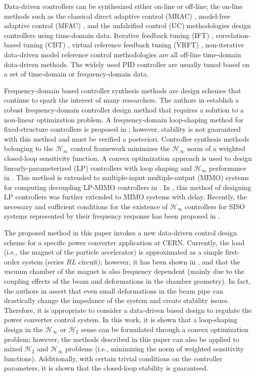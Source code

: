 \documentclass[a4paper, 10pt, conference]{ieeeconf}
\begin{document}
Data-driven controllers can be synthesized either on-line or off-line; the on-line methods such as the classical direct adaptive control (MRAC) \cite{LLMK11}, model-free adaptive control (MFAC) \cite{HJ13}, and the unfalsified control (UC) \cite{ST97} methodologies design controllers using time-domain data. Iterative feedback tuning (IFT) \cite{Hja02}, correlation-based tuning (CBT) \cite{KMB02a}, virtual reference feedback tuning (VRFT) \cite{CLS02}, non-iterative data-driven model reference control \cite{KVB07} methodologies are all off-line time-domain data-driven methods.  The widely used PID controller are usually tuned based on a set of time-domain or frequency-domain data. 

Frequency-domain based controller synthesis methods are design schemes that continue to spark the interest of many researchers. The authors in \cite{KNND13b} establish a robust frequency-domain controller design method that requires a solution to a non-linear optimization problem. A frequency-domain loop-shaping method for fixed-structure controllers is proposed in \cite{KNND13c}; however, stability is not guaranteed with this method and must be verified a posteriori. Controller synthesis methods belonging to the $\mathcal{H}_{\infty}$ control framework minimizes the $\mathcal{H}_{\infty}$ norm of a weighted closed-loop sensitivity function. A convex optimization approach is used to design linearly-parameterized (LP) controllers with loop shaping and $\mathcal{H}_{\infty}$ performance in \cite{KG10}. This method is extended to multiple-input multiple-output (MIMO) systems for computing decoupling LP-MIMO controllers in \cite{GKL10b}. In \cite{NK14}, this method of designing LP controllers was further extended to MIMO systems with delay. Recently, the necessary and sufficient conditions for the existence of $\mathcal{H}_{\infty}$ controllers for SISO systems represented by their frequency response has been proposed in \cite{KNZ16}.

The proposed method in this paper invokes a new data-driven control design scheme for a specific power converter application at CERN. Currently, the load (i.e., the magnet of the particle accelerator) is approximated as a simple first-order system (series $RL$ circuit); however, it has been shown in \cite{KZ98}, \cite{NW95} and \cite{NS79} that the vacuum chamber of the magnet is also frequency dependent (mainly due to the coupling effects of the beam and deformations in the chamber geometry). In fact, the authors in \cite{NW95} assert that even small deformations in the beam pipe can drastically change the impedance of the system and create stability issues. Therefore, it is appropriate to consider a data-driven based design to regulate the power converter control system.  In this work, it is shown that a loop-shaping design in the $\mathcal{H}_\infty$ or $\mathcal{H}_2$ sense can be formulated through a convex optimization problem; however, the methods described in this paper can also be applied to mixed $\mathcal{H}_2$ and $\mathcal{H}_\infty$ problems (i.e., minimizing the norm of weighted sensitivity functions). Additionally, with certain trivial conditions on the controller parameters, it is shown that the closed-loop stability is guaranteed. 
\end{document}

